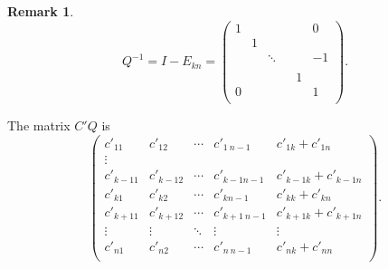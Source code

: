\documentclass{article}
\theoremstyle{plain}
\theoremstyle{definition}
\newtheorem{rem}[thm]{Remark}
\begin{document}
% 


    \begin{rem}

    $$Q^{-1}=I-E_{kn}=\begin{pmatrix}
    1 &  & & &  & 0 \\
    & 1 &  &      &  &  \\
    &  & \ddots & &  & -1 \\
    &  &        & &  &  \\
    &  & & & 1 &  \\
    0 &  & & &  & 1 \\
    \end{pmatrix}.$$

    The matrix $C'Q$ is
    $$\begin{pmatrix}
    c'_{11}     & c'_{12} & \cdots     & c'_{1\ n-1} & c'_{1k}+c'_{1n} \\
    \vdots \\
    c'_{k-11}     & c'_{k-1 2}           & \cdots     & c'_{k-1 n-1} & c'_{k-1k}+c'_{k-1n} \\
    c'_{k1} & c'_{k2} &\cdots      & c'_{kn-1} & c'_{kk}+c'_{kn}\\
    c'_{k+11}     & c'_{k+12}           & \cdots     & c'_{k+1\ n-1} & c'_{k+1k}+c'_{k+1n} \\
    \vdots              & \vdots & \ddots              & \vdots & \vdots \\
    c'_{n1}             & c'_{n2} & \cdots             & c'_{n\ n-1} & c'_{nk}+c'_{nn} \\
    \end{pmatrix}.
    $$
    \end{rem}

\begin{comment}


{Remark}

	\begin{proof}
        (i) is immediate from Definition~\ref{m_rooted} and the observation that   
        $$Q^{-1}=I-E_{kn}=\begin{pmatrix}
        1 &  & & &  & 0 \\
         & 1 &  &      &  &  \\
         &  & \ddots & &  & -1 \\
         &  &        & &  &  \\
          &  & & & 1 &  \\
        0 &  & & &  & 1 \\
        \end{pmatrix},$$
    \end{proof}
 \end{comment}   
\end{document}
